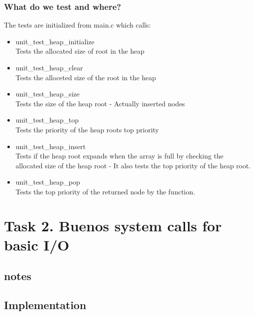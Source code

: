 \documentclass[a4paper,12pt,danish]{report}
\begin{document}
\subsubsection{What do we test and where?}
The tests are initialized from main.c which calls:
\\
\begin{itemize}
  \item{unit\_test\_heap\_initialize}
    \\
    Tests the allocated size of root in the heap
  \item{unit\_test\_heap\_clear}
    \\
    Tests the alloceted size of the root in the heap
  \item{unit\_test\_heap\_size}
    \\
    Tests the size of the heap root - Actually inserted nodes
  \item{unit\_test\_heap\_top}
    \\
    Tests the priority of the heap roots top priority
  \item{unit\_test\_heap\_insert}
    \\
    Tests if the heap root expands when the array is full by checking the allocated size of the heap root - It also tests the top priority of the heap root.
  \item{unit\_test\_heap\_pop}
    \\
    Tests the top priority of the returned node by the function.
\end{itemize}
\newpage
\section{Task 2. Buenos system calls for basic I/O}
\subsection{notes}

\subsection{Implementation}
\end{document}
